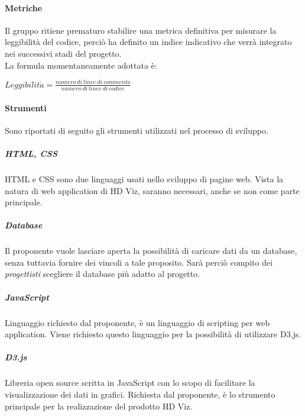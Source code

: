 \documentclass[../norme_di_progetto.tex]{subfiles}
\begin{document}
    \paragraph{Metriche}
    Il gruppo ritiene prematuro stabilire una metrica definitiva per misurare la leggibilità del codice, perciò ha definito un indice indicativo che verrà integrato nei successivi stadi del progetto.\\
    La formula momentaneamente adottata è:
    \begin{center}
        $Leggibilit\grave{a} = \frac{numero\ di\ linee\ di\ commento}{numero\ di\ linee\ di\ codice}$
    \end{center}

    \paragraph{Strumenti}
    Sono riportati di seguito gli strumenti utilizzati nel processo di sviluppo.

        \subparagraph{HTML, CSS}
        HTML e CSS sono due linguaggi usati nello sviluppo di pagine web. Vista la natura di web application di HD Viz, saranno necessari, anche se non come parte principale.

        \subparagraph{Database}
        Il proponente vuole lasciare aperta la possibilità di caricare dati da un database, senza tuttavia fornire dei vincoli a tale proposito. Sarà perciò compito dei \emph{progettisti} scegliere il database più adatto al progetto.

        \subparagraph{JavaScript}
        Linguaggio richiesto dal proponente, è un linguaggio di scripting per web application. Viene richiesto questo linguaggio per la possibilità di utilizzare D3.js.

        \subparagraph{D3.js}
        Libreria open source scritta in JavaScript con lo scopo di facilitare la visualizzazione dei dati in grafici. Richiesta dal proponente, è lo strumento principale per la realizzazione del prodotto HD Viz.
\end{document}
